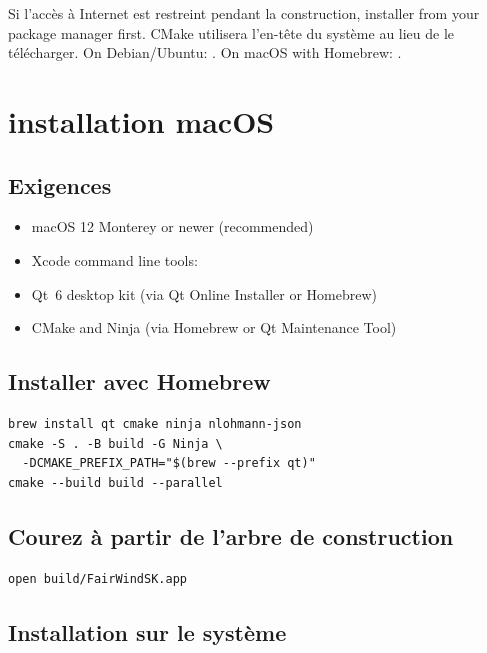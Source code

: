 \begin{tipbox}
Si l'accès à Internet est restreint pendant la construction, installer
 from your package manager first.
CMake utilisera l'en-tête du système au lieu de le télécharger.
On Debian/Ubuntu: .
On macOS with Homebrew: .
\end{tipbox}

\section{installation macOS}
\label{app:macos}

\subsection{Exigences}

\begin{itemize}
  \item macOS 12 Monterey or newer (recommended)
  \item Xcode command line tools: 
  \item Qt~6 desktop kit (via Qt Online Installer or Homebrew)
  \item CMake and Ninja (via Homebrew or Qt Maintenance Tool)
\end{itemize}

\subsection{Installer avec Homebrew}

\begin{lstlisting}
brew install qt cmake ninja nlohmann-json
cmake -S . -B build -G Ninja \
  -DCMAKE_PREFIX_PATH="$(brew --prefix qt)"
cmake --build build --parallel
\end{lstlisting}

\subsection{Courez à partir de l'arbre de construction}

\begin{lstlisting}
open build/FairWindSK.app
\end{lstlisting}

\subsection{Installation sur le système}

